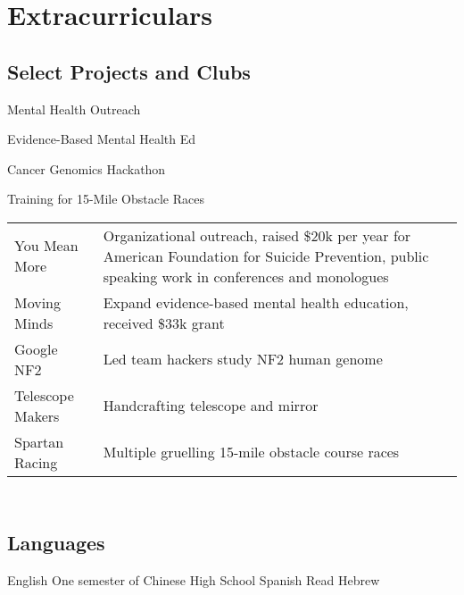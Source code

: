 \documentclass[]{deedy-resume-openfont}
\begin{document}
\begin{minipage}[t]{0.33\textwidth}
\small{
\section{Extracurriculars}
\subsection{Select Projects and Clubs}
\vspace{\topsep}
\begin{tightemize}\item Mental Health Outreach \end{tightemize}
\begin{tightemize}\item Evidence-Based Mental Health Ed \end{tightemize}
\begin{tightemize}\item Cancer Genomics Hackathon \end{tightemize}
\begin{tightemize}\item Training for 15-Mile Obstacle Races \end{tightemize}
}




\iffalse

\small{
\begin{tabular}{p{1cm}p{5cm}}
You Mean More & Organizational outreach, raised \$20k per year for American Foundation for Suicide Prevention, public speaking work in conferences and monologues \\
Moving Minds & Expand evidence-based mental health education, received \$33k grant\\
Google NF2 & Led team hackers study NF2 human genome \\
Telescope Makers & Handcrafting telescope and mirror\\
Spartan Racing & Multiple gruelling 15-mile obstacle course races\\


\end{tabular}}
\sectionsep

\subsection{\\Languages}
English \textbullet{} One semester of Chinese \textbullet{} High School Spanish \textbullet{} Read Hebrew


\end{minipage}
\end{document}
